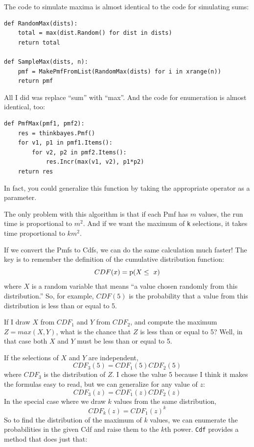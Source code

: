 \documentclass[12pt]{book}
\begin{document}
The code to simulate maxima is almost identical to the code for
simulating sums:

\begin{verbatim}
def RandomMax(dists):
    total = max(dist.Random() for dist in dists)
    return total

def SampleMax(dists, n):
    pmf = MakePmfFromList(RandomMax(dists) for i in xrange(n))
    return pmf
\end{verbatim}

All I did was replace ``sum'' with ``max''.  And the code
for enumeration is almost identical, too:

\begin{verbatim}
def PmfMax(pmf1, pmf2):
    res = thinkbayes.Pmf()
    for v1, p1 in pmf1.Items():
        for v2, p2 in pmf2.Items():
            res.Incr(max(v1, v2), p1*p2)
    return res
\end{verbatim}

In fact, you could generalize this function by taking the
appropriate operator as a parameter.

The only problem with this algorithm is that if each Pmf
has $m$ values, the run time is proportional to $m^2$.
And if we want the maximum of {\tt k} selections, it takes
time proportional to $k m^2$.

If we convert the Pmfs to Cdfs, we can do the same calculation
much faster!  The key is to remember the definition of the
cumulative distribution function:
%
\[ CDF(x) = \mathrm{p}(X \le~x) \]
%
where $X$ is a random variable that means ``a value chosen
randomly from this distribution.''  So, for example, $CDF(5)$
is the probability that a value from this distribution is less
than or equal to 5.

If I draw $X$ from $CDF_1$ and $Y$ from $CDF_2$, and compute
the maximum $Z = max(X, Y)$, what is the chance that $Z$ is
less than or equal to 5?  Well, in that case both $X$ and $Y$
must be less than or equal to 5.

If the selections of $X$ and $Y$ are independent,
%
\[ CDF_3(5) = CDF_1(5) CDF_2(5) \] 
%
where $CDF_3$ is the distribution of $Z$.  I chose the value
5 because I think it makes the formulas easy to read, but we
can generalize for any value of $z$:
%
\[ CDF_3(z) = CDF_1(z) CDF_2(z) \]
%
In the special case where we draw $k$ values from the same
distribution, 
%
\[ CDF_k(z) = CDF_1(z)^k \]
%
So to find the distribution of the maximum of $k$ values,
we can enumerate the probabilities in the given Cdf
and raise them to the $k$th power.
\verb"Cdf" provides a method that does just that:
\end{document}

